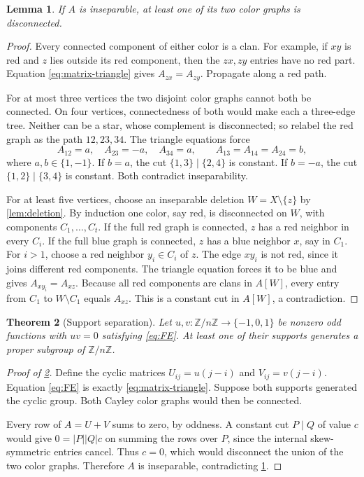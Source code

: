 \documentclass[11pt,a4paper]{amsart}
\numberwithin{equation}{section}
\theoremstyle{plain}
\newtheorem{theorem}{Theorem}[section]
\newtheorem{lemma}[theorem]{Lemma}
\theoremstyle{definition}
\newcommand{\Z}{\mathbb Z}
\begin{document}
\begin{lemma}\label{lem:color}
If \(A\) is inseparable, at least one of its two color graphs is disconnected.
\end{lemma}
\begin{proof}
Every connected component of either color is a clan.  For example, if
\(xy\) is red and \(z\) lies outside its red component, then the \(zx,zy\)
entries have no red part.  Equation \eqref{eq:matrix-triangle} gives
\(A_{zx}=A_{zy}\).  Propagate along a red path.

For at most three vertices the two disjoint color graphs cannot both
be connected.  On four vertices, connectedness of both would make each
a three-edge tree.  Neither can be a star, whose complement is disconnected;
so relabel the red graph as the path \(12,23,34\).
The triangle equations force
\[
A_{12}=a,\quad A_{23}=-a,\quad A_{34}=a,
\qquad A_{13}=A_{14}=A_{24}=b,
\]
where \(a,b\in\{1,-1\}\).  If \(b=a\), the cut
\(\{1,3\}\mid\{2,4\}\) is constant.  If \(b=-a\), the cut
\(\{1,2\}\mid\{3,4\}\) is constant.  Both contradict inseparability.

For at least five vertices, choose an inseparable deletion \(W=X\setminus
\{z\}\) by \cref{lem:deletion}.  By induction one color, say red, is
disconnected on \(W\), with components \(C_1,\ldots,C_t\).
If the full red graph is connected, \(z\) has a red neighbor in every \(C_i\).
If the full blue graph is connected, \(z\) has a blue neighbor \(x\), say
in \(C_1\).  For \(i>1\), choose a red neighbor \(y_i\in C_i\) of \(z\).
The edge \(xy_i\) is not red, since it joins different red components.
The triangle equation forces it to be blue and gives
\(A_{xy_i}=A_{xz}\).  Because all red components are clans in \(A[W]\),
every entry from \(C_1\) to \(W\setminus C_1\) equals \(A_{xz}\).
This is a constant cut in \(A[W]\), a contradiction.
\end{proof}

\begin{theorem}[Support separation]\label{thm:support}
Let \(u,v:\Z/n\Z\to\{-1,0,1\}\) be nonzero odd functions with \(uv=0\)
satisfying \eqref{eq:FE}.  At least one of their supports generates a
proper subgroup of \(\Z/n\Z\).
\end{theorem}

\begin{proof}[Proof of \cref{thm:support}]
Define the cyclic matrices \(U_{ij}=u(j-i)\) and \(V_{ij}=v(j-i)\).
Equation \eqref{eq:FE} is exactly \eqref{eq:matrix-triangle}.
Suppose both supports generated the cyclic group.  Both Cayley color
graphs would then be connected.

Every row of \(A=U+V\) sums to zero, by oddness.  A constant cut \(P\mid Q\)
of value \(c\) would give \(0=|P||Q|c\) on summing the rows over \(P\),
since the internal skew-symmetric entries cancel.  Thus \(c=0\), which
would disconnect the union of the two color graphs.  Therefore \(A\) is
inseparable, contradicting \cref{lem:color}.
\end{proof}
\end{document}
